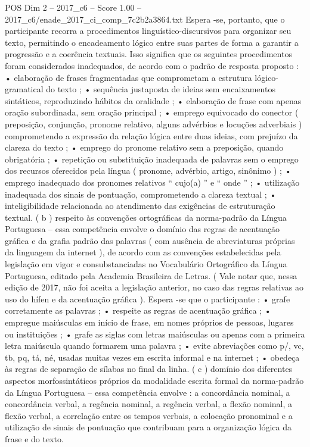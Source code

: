 \begin{textsample}{POS Dim 2 – 2017\_c6 – Score 1.00 – 2017\_c6/enade\_2017\_ci\_comp\_7c2b2a3864.txt}
Espera -se, portanto, que o participante recorra a procedimentos linguístico-discursivos para organizar seu texto, permitindo o encadeamento lógico entre suas partes de forma a garantir a progressão e a coerência textuais.
Isso significa que os seguintes procedimentos foram considerados inadequados, de acordo com o padrão de resposta proposto : • elaboração de frases fragmentadas que comprometam a estrutura lógico-gramatical do texto ; • sequência justaposta de ideias sem encaixamentos sintáticos, reproduzindo hábitos da oralidade ; • elaboração de frase com apenas oração subordinada, sem oração principal ; • emprego equivocado do conector ( preposição, conjunção, pronome relativo, alguns advérbios e locuções adverbiais ) comprometendo a expressão da relação lógica entre duas ideias, com prejuízo da clareza do texto ; • emprego do pronome relativo sem a preposição, quando obrigatória ; • repetição ou substituição inadequada de palavras sem o emprego dos recursos oferecidos pela língua ( pronome, advérbio, artigo, sinônimo ) ; • emprego inadequado dos pronomes relativos “ cujo(a) ” e “ onde ” ; • utilização inadequada dos sinais de pontuação, comprometendo a clareza textual ; • inteligibilidade relacionada ao atendimento das exigências de estruturação textual. ( b ) respeito às convenções ortográficas da norma-padrão da Língua Portuguesa – essa competência envolve o domínio das regras de acentuação gráfica e da grafia padrão das palavras ( com ausência de abreviaturas próprias da linguagem da internet ), de acordo com as convenções estabelecidas pela legislação em vigor e consubstanciadas no Vocabulário Ortográfico da Língua Portuguesa, editado pela Academia Brasileira de Letras. ( Vale notar que, nessa edição de 2017, não foi aceita a legislação anterior, no caso das regras relativas ao uso do hífen e da acentuação gráfica ).
Espera -se que o participante : • grafe corretamente as palavras ; • respeite as regras de acentuação gráfica ; • empregue maiúsculas em início de frase, em nomes próprios de pessoas, lugares ou instituições ; • grafe as siglas com letras maiúsculas ou apenas com a primeira letra maiúscula quando formarem uma palavra ; • evite abreviações como p/, vc, tb, pq, tá, né, usadas muitas vezes em escrita informal e na internet ; • obedeça às regras de separação de sílabas no final da linha. ( c ) domínio dos diferentes aspectos morfossintáticos próprios da modalidade escrita formal da norma-padrão da Língua Portuguesa – essa competência envolve : a concordância nominal, a concordância verbal, a regência nominal, a regência verbal, a flexão nominal, a flexão verbal, a correlação entre os tempos verbais, a colocação pronominal e a utilização de sinais de pontuação que contribuam para a organização lógica da frase e do texto.

\end{textsample}
